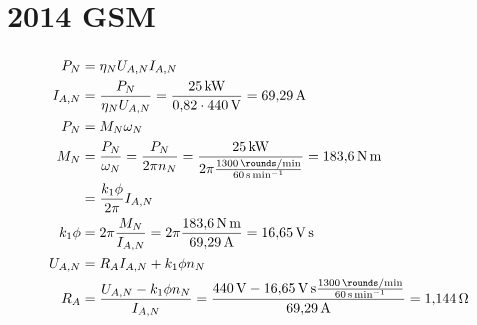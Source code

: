 \documentclass[11pt,a4paper]{scrartcl}
\newcommand{\0}{_{\mybr{0}}}
\newcommand{\1}{_{\mybr{1}}}
\newcommand{\2}{_{\mybr{2}}}
\begin{document}
\part{2014 GSM}
\section{}
\begin{align}
P_N&=\eta_N U_{A,N} I_{A,N}\\
I_{A,N}&=\frac{P_N}{\eta_N U_{A,N}}=\frac{\SI{25}{\kilo\watt}}{\num{0.82}\cdot\SI{440}{\volt}}=\SI{69.29}{\ampere}\\
P_N&=M_N\omega_N\\
M_N&=\frac{P_N}{\omega_N}=\frac{P_N}{2\pi n_N}=\frac{\SI{25}{\kilo\watt}}{2\pi \frac{\SI{1300}{\rounds\per\minute}}{\SI{60}{\second\per\minute}}}=\SI{183.6}{\newton\metre}\\
&=\frac{k_1\phi}{2\pi}I_{A,N}\\
k_1\phi&=2\pi \frac{M_N}{I_{A,N}}=2\pi\frac{\SI{183.6}{\newton\metre}}{\SI{69.29}{\ampere}}=\SI{16.65}{\volt\second}\\
U_{A,N}&=R_A I_{A,N} + k_1\phi n_N\\
R_A&=\frac{U_{A,N}-k_1\phi n_N}{I_{A,N}}=\frac{\SI{440}{\volt}-\SI{16.65}{\volt\second}\frac{\SI{1300}{\rounds\per\minute}}{\SI{60}{\second\per\minute}}}{\SI{69.29}{\ampere}}=\SI{1.144}{\ohm}
\end{align}
\end{document}
